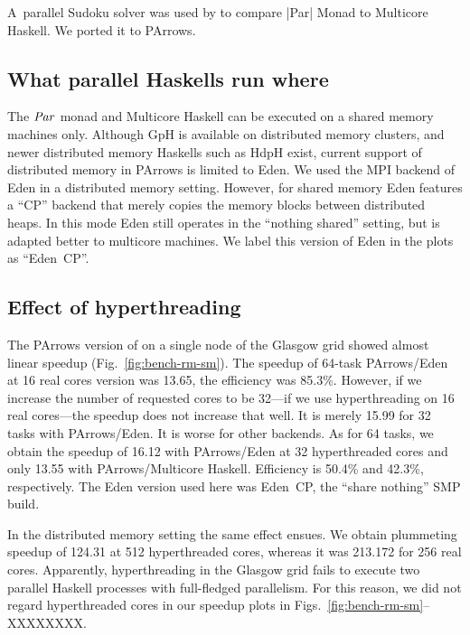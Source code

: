 A~parallel Sudoku solver was used by \citet{par-monad} to compare |Par| Monad
to Multicore Haskell. We ported it to PArrows.



\subsection{What parallel Haskells run where}

The \ensuremath{\Conid{Par}} monad and Multicore Haskell can be executed on a shared
memory machines only. Although GpH is available on distributed memory
clusters, and newer distributed memory Haskells such as HdpH exist,
current support of distributed memory in PArrows is limited to
Eden. We used the MPI backend of Eden in a distributed memory
setting. However, for shared memory Eden features a ``CP'' backend
that merely copies the memory blocks between distributed heaps. In
this mode Eden still operates in the ``nothing shared'' setting, but
is adapted better to multicore machines. We label this version of Eden
in the plots as ``Eden~CP''.



\subsection{Effect of hyperthreading}

The PArrows version of \rmtest on a single node of the Glasgow grid
showed almost linear speedup (Fig.~\ref{fig:bench-rm-sm}). The speedup
of 64-task PArrows/Eden at 16 real cores version was 13.65, the
efficiency was 85.3\%.  However, if we increase the number of
requested cores to be 32---\ie if we use hyperthreading on 16 real
cores---the speedup does not increase that well. It is merely 15.99
for 32 tasks with PArrows/Eden. It is worse for other backends.  As
for 64 tasks, we obtain the speedup of 16.12 with PArrows/Eden at 32
hyperthreaded cores and only 13.55 with PArrows/Multicore
Haskell. Efficiency is 50.4\% and 42.3\%, respectively. The Eden
version used here was Eden~CP, the ``share nothing'' SMP build.

In the distributed memory setting the same effect ensues. We obtain
plummeting speedup of 124.31 at 512 hyperthreaded cores, whereas it was
213.172 for 256 real cores. Apparently, hyperthreading in the Glasgow
grid fails to execute two parallel Haskell processes with full-fledged
parallelism. For this reason, we did not regard hyperthreaded cores in
our speedup plots in Figs.~\ref{fig:bench-rm-sm}--XXXXXXXX.


